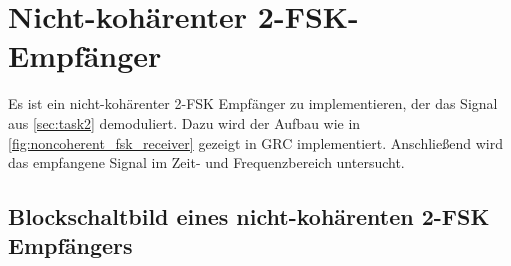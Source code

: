 \newpage
\section{Nicht-kohärenter 2-FSK-Empfänger}


Es ist ein nicht-kohärenter 2-FSK Empfänger zu implementieren, der das Signal aus \autoref{sec:task2} demoduliert. Dazu wird der Aufbau wie in \autoref{fig:noncoherent_fsk_receiver} gezeigt in GRC implementiert. Anschließend wird das empfangene Signal im Zeit- und Frequenzbereich untersucht.

\subsection{Blockschaltbild eines nicht-kohärenten 2-FSK Empfängers}

